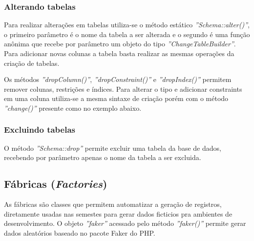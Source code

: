 \subsubsection{Alterando tabelas}

Para realizar alterações em tabelas utiliza-se o método estático \textit{''Schema::alter()''}, o primeiro parâmetro é o nome da tabela a ser alterada e o segundo é uma função anônima que recebe por parâmetro um objeto do tipo \textit{''ChangeTableBuilder''}. Para adicionar novas colunas a tabela basta realizar as mesmas operações da criação de tabelas.


\label{scripts/migration_alter_table.php}

Os métodos \textit{''dropColumn()''}, \textit{''dropConstraint()''} e \textit{''dropIndex()''} permitem remover colunas, restrições e índices. Para alterar o tipo e adicionar constraints em uma coluna utiliza-se a mesma sintaxe de criação porém com o método \textit{''change()''} presente como no exemplo abaixo.


\label{scripts/migration_drop_column.php}

\subsubsection{Excluindo tabelas}
O método \textit{''Schema::drop''} permite excluir uma tabela da base de dados, recebendo por parâmetro apenas o nome da tabela a ser excluida.

\spaceH{}

\label{scripts/migration_drop_table.php}

\subsection{Fábricas (\textit{Factories})}
As fábricas são classes que permitem automatizar a geração de registros, diretamente usadas nas semestes para gerar dados ficticios pra ambientes de desenvolvimento. O objeto \textit{''faker''} acessado pelo método \textit{''faker()''} permite gerar dados aleatórios baseado no pacote Faker do PHP.

\spaceH{}

\label{scripts/factory_class_example.php}

